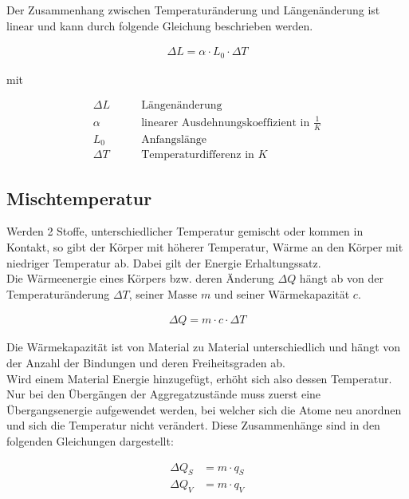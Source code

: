 \documentclass[a4paper]{scrartcl}
\numberwithin{equation}{subsection}
\begin{document}
\newpage

Der Zusammenhang zwischen Temperaturänderung und Längenänderung ist linear und kann durch folgende Gleichung beschrieben werden. \cite{anl}

\begin{align}
\Delta L = \alpha \cdot L_0 \cdot \Delta T
\end{align}

mit 

\begin{align*}
\Delta L	 \qquad 	& \text{Längenänderung} \\
\alpha	 \qquad 	& \text{linearer Ausdehnungskoeffizient in $\frac{1}{K}$} \\
L_0 		 \qquad 	& \text{Anfangslänge} \\
\Delta T	 \qquad 	& \text{Temperaturdifferenz in $K$}
\end{align*}

\subsection{Mischtemperatur}

Werden 2 Stoffe, unterschiedlicher Temperatur gemischt oder kommen in Kontakt, so gibt der Körper mit höherer Temperatur, Wärme an den Körper mit niedriger Temperatur ab. Dabei gilt der Energie Erhaltungssatz. \\

Die Wärmeenergie eines Körpers bzw. deren Änderung $\Delta Q$ hängt ab von der Temperaturänderung $\Delta T$, seiner Masse $m$ und seiner Wärmekapazität $c$. \cite{anl}

\begin{align}
\Delta Q = m \cdot c \cdot \Delta T
\end{align}

Die Wärmekapazität ist von Material zu Material unterschiedlich und hängt von der Anzahl der Bindungen und deren Freiheitsgraden ab.\\

Wird einem Material Energie hinzugefügt, erhöht sich also dessen Temperatur. Nur bei den Übergängen der Aggregatzustände muss zuerst eine Übergangsenergie aufgewendet werden, bei welcher sich die Atome neu anordnen und sich die Temperatur nicht verändert. 
Diese Zusammenhänge sind in den folgenden Gleichungen dargestellt: \cite{anl}

\begin{align}
\Delta Q_S &= m \cdot q_S \\
\Delta Q_V &= m \cdot q_V
\end{align}
\end{document}
